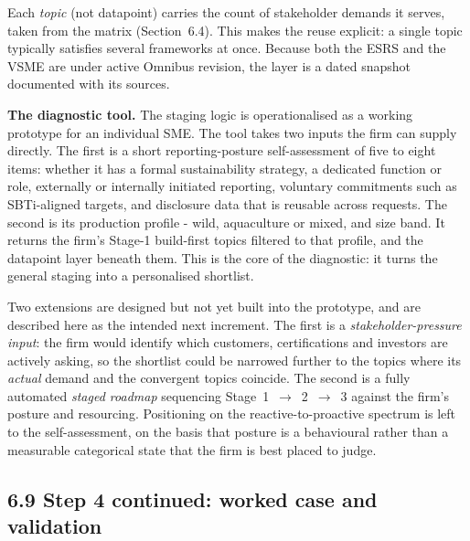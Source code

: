 Each \emph{topic} (not datapoint) carries the count of stakeholder demands it
serves, taken from the matrix (Section~6.4). This makes the reuse
explicit: a single topic typically satisfies several frameworks at once. Because
both the ESRS and the VSME are under active Omnibus revision, the layer is a dated
snapshot documented with its sources.

\textbf{The diagnostic tool.} The staging logic is operationalised as a working
prototype for an individual SME. The tool takes two inputs the firm can supply
directly. The first is a short reporting-posture self-assessment of five to eight
items: whether it has a formal sustainability strategy, a dedicated function or
role, externally or internally initiated reporting, voluntary commitments such as
SBTi-aligned targets, and disclosure data that is reusable across requests. The
second is its production profile - wild, aquaculture or mixed, and size band. It
returns the firm's Stage-1 build-first topics filtered to that profile, and the
datapoint layer beneath them. This is the core of the diagnostic: it turns the
general staging into a personalised shortlist.

Two extensions are designed but not yet built into the prototype, and are described
here as the intended next increment. The first is a \emph{stakeholder-pressure
input}: the firm would identify which customers, certifications and investors are
actively asking, so the shortlist could be narrowed further to the topics where its
\emph{actual} demand and the convergent topics coincide. The second is a fully
automated \emph{staged roadmap} sequencing Stage~1~$\rightarrow$~2~$\rightarrow$~3
against the firm's posture and resourcing. Positioning on the reactive-to-proactive
spectrum is left to the self-assessment, on the basis that posture is a behavioural
rather than a measurable categorical state that the firm is best placed to judge.

\FloatBarrier
\subsection{6.9 Step 4 continued: worked case and
validation}\label{cm-worked-case}

